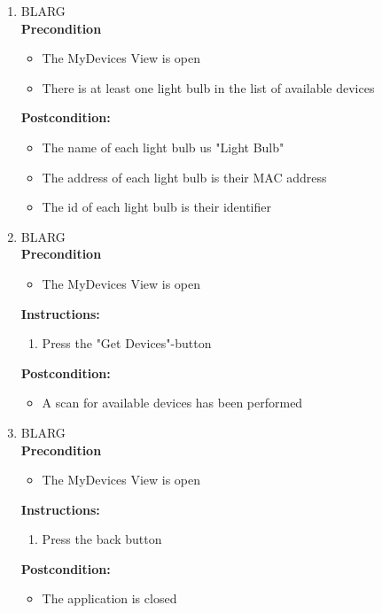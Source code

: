 \documentclass[a4paper]{article}
\newlength{\testlabellength}
\newenvironment{testlist}{\begin{enumerate}[label=\bfseries Instruction \thesubsection.\arabic* , labelindent=0pt, labelwidth=\testlabellength , leftmargin=2cm]}{\end{enumerate}}
\newenvironment{precondition}{
{\color{white}BLARG}\\ 
\textbf{Precondition}
\begin{itemize}[labelindent=0cm, labelwidth=2cm , leftmargin=1cm]
}
{\end{itemize}}
\newenvironment{instruction}{
\textbf{Instructions:}
\begin{enumerate}[label=\bfseries  \arabic*., labelindent=0cm, labelwidth=2cm , leftmargin=1cm]
}
{\end{enumerate}}
\newenvironment{postcondition}{
\textbf{Postcondition:}
\begin{itemize}[labelindent=0cm, labelwidth=2cm , leftmargin=1cm]
}
{\end{itemize}}
\begin{document}
\begin{appendices}
\begin{testlist}
   
	\item
		\begin{precondition}
			\item The MyDevices View is open
			\item There is at least one light bulb in the list of available devices
		\end{precondition}
		\begin{postcondition}
			\item The name of each light bulb us "Light Bulb"
			\item The address of each light bulb is their MAC address
			\item The id of each light bulb is their identifier
		\end{postcondition}
		   
   
	\item
		\begin{precondition}
			\item The MyDevices View is open
		\end{precondition}
		\begin{instruction}
			\item Press the "Get Devices"-button
		\end{instruction}
		\begin{postcondition}
			\item A scan for available devices has been performed
		\end{postcondition}
		   
   
	\item
		\begin{precondition}
			\item The MyDevices View is open
		\end{precondition}
		\begin{instruction}
			\item Press the back button
		\end{instruction}
		\begin{postcondition}
			\item The application is closed
		\end{postcondition}
		   

\end{testlist}
\end{appendices}
\end{document}
